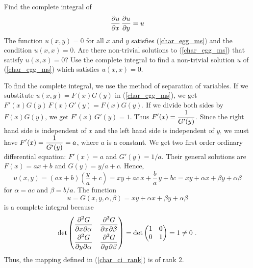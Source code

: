 \begin{egg}
Find the complete integral of
\begin{equation} \label{char_egg_ms}
\pdydx{u}{x}\,\pdydx{u}{y} = u
\end{equation}
The function $u(x,y)=0$ for all $x$ and $y$ satisfies
(\ref{char_egg_ms}) and the condition $u(x,x)=0$.  Are there
non-trivial solutions to (\ref{char_egg_ms}) that satisfy $u(x,x)=0$?
Use the complete integral to find a non-trivial solution $u$ of
(\ref{char_egg_ms}) which satisfies $u(x,x) = 0$.

To find the complete integral, we use the method of separation of
variables.  If we substitute $u(x,y) = F(x)G(y)$ in
(\ref{char_egg_ms}), we get $F'(x)G(y)\, F(x)G'(y) = F(x)G(y)$.  If
we divide both sides by $F(x)G(y)$, we get $F'(x) \, G'(y) = 1$. Thus
$\DS F'(x) = \frac{1}{G'(y)}$.  Since the right hand side is
independent of $x$ and the left hand side is independent of $y$, we
must have $\DS F'(x) = \frac{1}{G'(y)} = a$, where $a$ is a
constant.  We get two first order ordinary differential equation:
$F'(x)= a$ and $G'(y) = 1/a$.
Their general solutions are $F(x) = ax+b$ and $G(y) = y/a + c$.  Hence,
\[
u(x,y) = (ax+b)\left(\frac{y}{a} + c\right)
= xy + ac\, x + \frac{b}{a} \, y + bc
= xy + \alpha x + \beta y + \alpha \beta
\]
for $\alpha = ac$ and $\beta = b/a$.  The function
\[
u = G(x,y,\alpha,\beta) = xy + \alpha x + \beta y + \alpha \beta
\]
is a complete integral because
\[
\det
\begin{pmatrix}
\DS \pdydxnm{G}{x}{\alpha}{2}{}{} &
\DS \pdydxnm{G}{x}{\beta}{2}{}{} \\[0.7em]
\DS \pdydxnm{G}{y}{\alpha}{2}{}{} &
\DS \pdydxnm{G}{y}{\beta}{2}{}{}
\end{pmatrix}
= \det
\begin{pmatrix}
1 & 0 \\ 0 & 1
\end{pmatrix} = 1 \neq 0 \ .
\]
Thus, the mapping defined in (\ref{char_ci_rank}) is of rank $2$.


\end{egg}
